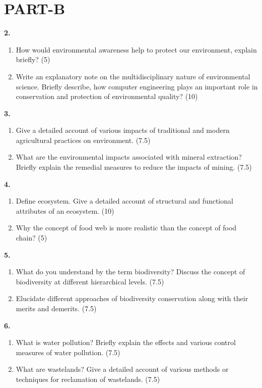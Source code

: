 \documentclass[12pt,a4paper]{article}
\begin{document}
\vspace{1em}

\section*{\textbf{PART-B}}

\noindent \textbf{2.}
\begin{enumerate}[label=(\alph*)]
    \item How would environmental awareness help to protect our environment, explain briefly? (5)
    \item Write an explanatory note on the multidisciplinary nature of environmental science. Briefly describe, how computer engineering plays an important role in conservation and protection of environmental quality? (10)
\end{enumerate}

\noindent \textbf{3.}
\begin{enumerate}[label=(\alph*)]
    \item Give a detailed account of various impacts of traditional and modern agricultural practices on environment. (7.5)
    \item What are the environmental impacts associated with mineral extraction? Briefly explain the remedial measures to reduce the impacts of mining. (7.5)
\end{enumerate}

\noindent \textbf{4.}
\begin{enumerate}[label=(\alph*)]
    \item Define ecosystem. Give a detailed account of structural and functional attributes of an ecosystem. (10)
    \item Why the concept of food web is more realistic than the concept of food chain? (5)
\end{enumerate}

\noindent \textbf{5.}
\begin{enumerate}[label=(\alph*)]
    \item What do you understand by the term biodiversity? Discuss the concept of biodiversity at different hierarchical levels. (7.5)
    \item Elucidate different approaches of biodiversity conservation along with their merits and demerits. (7.5)
\end{enumerate}

\noindent \textbf{6.}
\begin{enumerate}[label=(\alph*)]
    \item What is water pollution? Briefly explain the effects and various control measures of water pollution. (7.5)
    \item What are wastelands? Give a detailed account of various methods or techniques for reclamation of wastelands. (7.5)
\end{enumerate}
\end{document}
